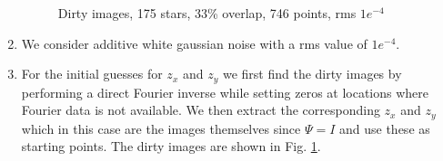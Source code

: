 \begin{enumerate}
\begin{figure}[t!]
\hspace{-0.5in}
		\hspace{-1in}
\caption [Dirty images, 175 stars, 33\% overlap, 746 points,  rms $1e^{-4}$]{Dirty images, 175 stars, 33\% overlap, 746 points, rms $1e^{-4}$}
\label{fig:expt13}
\end{figure}


\item We consider additive white gaussian noise with a rms value of $1e^{-4}$.
\item For the initial guesses for $z_x$ and $z_y$ we first find the dirty images by performing a direct Fourier inverse while setting zeros at locations where Fourier data is not available. We then extract the corresponding $z_x$ and $z_y$ which in this case are the images themselves since $\Psi = I$ and use these as starting points. The dirty images are shown in Fig. \ref{fig:expt13}.


\end{enumerate}
